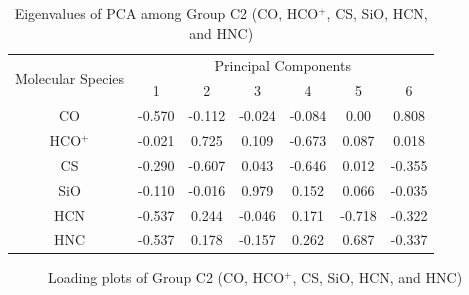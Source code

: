 \documentclass{aa}
\begin{document}
\begin{CJK*}{UTF8}{gbsn}
 
    \begin{table}[htp]
        \centering
        \begin{tabular}{ccccccc}
        \hline\hline
        \multirow{2}{*}{Molecular Species} & \multicolumn{6}{c}{Principal Components}                 \\ \cline{2-7} 
                                           & 1       & 2       & 3       & 4       & 5      & 6       \\ \hline
        CO                                 & -0.570 & -0.112 & -0.024 & -0.084 & 0.00 & 0.808  \\ \hline
        HCO$^+$                               & -0.021 & 0.725  & 0.109  & -0.673 & 0.087  & 0.018  \\ \hline
        CS                                 & -0.290 & -0.607 & 0.043  & -0.646 & 0.012 & -0.355 \\ \hline
        SiO                                & -0.110 & -0.016 & 0.979  & 0.152  & 0.066  & -0.035 \\ \hline
        HCN                                & -0.537 & 0.244  & -0.046 & 0.171  & -0.718 & -0.322 \\ \hline
        HNC                                & -0.537 & 0.178  & -0.157 & 0.262  & 0.687 & -0.337 \\ \hline\hline
        \end{tabular}
        \caption{Eigenvalues of PCA among Group C2 (CO, HCO$^+$, CS, SiO, HCN, and HNC)}
        \label{table-6-eigen}
    \end{table}
   

     \begin{figure}[htbp]
        \centering  
        \caption{Loading plots of Group C2 (CO, HCO$^+$, CS, SiO, HCN, and HNC)}
        \label{Fig-6-load}
    \end{figure}
   

\end{CJK*}
\end{document}
